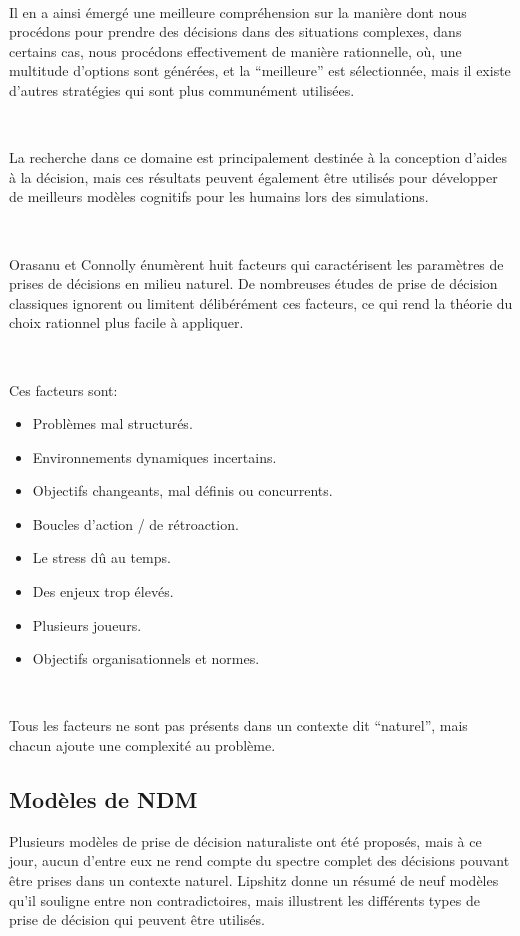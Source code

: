 ~\par
Il en a ainsi émergé une meilleure compréhension sur la manière dont nous procédons pour prendre des décisions dans des situations complexes, dans certains cas, nous procédons effectivement de manière rationnelle, où, une multitude d’options sont générées, et la “meilleure” est sélectionnée, mais il existe d’autres stratégies qui sont plus communément utilisées.

~\par
La recherche dans ce domaine est principalement destinée à la conception d’aides à la décision, mais ces résultats peuvent également être utilisés pour développer de meilleurs modèles cognitifs pour les humains lors des simulations.

~\par
Orasanu et Connolly \parencite{orasanu1993reinvention} énumèrent huit facteurs qui caractérisent les paramètres de prises de décisions en milieu naturel. De nombreuses études de prise de décision classiques ignorent ou limitent délibérément ces facteurs, ce qui rend la théorie du choix rationnel plus facile à appliquer.

~\par

Ces facteurs sont:
\begin{itemize}
\item Problèmes mal structurés.
\item Environnements dynamiques incertains.
\item Objectifs changeants, mal définis ou concurrents.
\item Boucles d'action / de rétroaction.
\item Le stress dû au temps.
\item Des enjeux trop élevés.
\item Plusieurs joueurs.
\item Objectifs organisationnels et normes.
\end{itemize}

~\par
Tous les facteurs ne sont pas présents dans un contexte dit “naturel”, mais chacun ajoute une complexité au problème.


\subsection{Modèles de NDM}

Plusieurs modèles de prise de décision naturaliste ont été proposés, mais à ce jour,
aucun d’entre eux ne rend compte du spectre complet des décisions pouvant être prises dans un contexte naturel. Lipshitz \parencite{lipshitz1993converging} donne un résumé de neuf modèles qu’il souligne entre non contradictoires, mais illustrent les différents types de prise de décision qui peuvent être utilisés.


